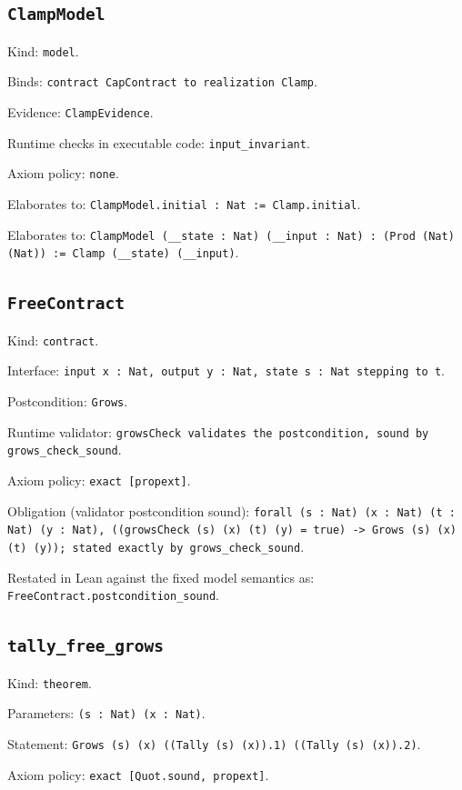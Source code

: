 \documentclass[11pt]{article}
\begin{document}
\subsection*{\texttt{ClampModel}}
\noindent Kind: \texttt{model}.\par
\noindent Binds: \texttt{contract CapContract to realization Clamp}.\par
\noindent Evidence: \texttt{ClampEvidence}.\par
\noindent Runtime checks in executable code: \texttt{input\_invariant}.\par
\noindent Axiom policy: \texttt{none}.\par
\noindent Elaborates to: \texttt{ClampModel.initial : Nat := Clamp.initial}.\par
\noindent Elaborates to: \texttt{ClampModel (\_\_state : Nat) (\_\_input : Nat) : (Prod (Nat) (Nat)) := Clamp (\_\_state) (\_\_input)}.\par
\subsection*{\texttt{FreeContract}}
\noindent Kind: \texttt{contract}.\par
\noindent Interface: \texttt{input x : Nat, output y : Nat, state s : Nat stepping to t}.\par
\noindent Postcondition: \texttt{Grows}.\par
\noindent Runtime validator: \texttt{growsCheck validates the postcondition, sound by grows\_check\_sound}.\par
\noindent Axiom policy: \texttt{exact [propext]}.\par
\noindent Obligation (validator postcondition sound): \texttt{forall (s : Nat) (x : Nat) (t : Nat) (y : Nat), ((growsCheck (s) (x) (t) (y) = true) -> Grows (s) (x) (t) (y)); stated exactly by grows\_check\_sound}.\par
\noindent Restated in Lean against the fixed model semantics as: \texttt{FreeContract.postcondition\_sound}.\par
\subsection*{\texttt{tally\_free\_grows}}
\noindent Kind: \texttt{theorem}.\par
\noindent Parameters: \texttt{(s : Nat) (x : Nat)}.\par
\noindent Statement: \texttt{Grows (s) (x) ((Tally (s) (x)).1) ((Tally (s) (x)).2)}.\par
\noindent Axiom policy: \texttt{exact [Quot.sound, propext]}.\par
\end{document}
